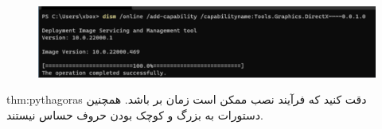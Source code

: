 {    \begin{figure}[H]
        \centering
        \setlength{\belowcaptionskip}{-10pt}
        \includegraphics[width=\textwidth]{Images/1.Intro.4.4.png}
        \caption*{}
    \end{figure}
}
\textbf{\vspace{25pt}}

\begin{theo}{thm:pythagoras}
{
    \Large
    دقت کنید که فرآیند نصب ممکن است زمان بر باشد. همچنین دستورات  به بزرگ و کوچک بودن حروف حساس نیستند.
}
\end{theo}

\newpage